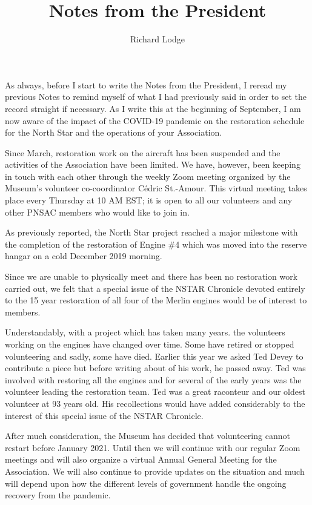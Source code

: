 
%


\title{Notes from the President}
\author{Richard Lodge}

\maketitle

As always, before I start to write the Notes from the President, I reread my
previous Notes to remind myself of what I had previously said in order to set
the record straight if necessary. As I write this at the beginning of
September, I am now aware of the impact of the COVID-19 pandemic on the
restoration schedule for the North Star and the operations of your
Association.

Since March, restoration work on the aircraft has been suspended and the
activities of the Association have been limited. We have, however, been keeping
in touch with each other through the weekly Zoom meeting organized by the
Museum's volunteer co-coordinator Cédric St.-Amour. This virtual meeting takes
place every Thursday at 10 AM EST; it is open to all our volunteers and any
other PNSAC members who would like to join in.

As previously reported, the North Star project reached a major milestone with
the completion of the restoration of Engine \#4 which was moved into the
reserve hangar on a cold December 2019 morning.

Since we are unable to physically meet and there has been no restoration work
carried out, we felt that a special issue of the NSTAR Chronicle devoted
entirely to the 15 year restoration of all four of the Merlin engines would be
of interest to members.

Understandably, with a project which has taken many years. the volunteers
working on the engines have changed over time. Some have retired or stopped
volunteering and sadly, some have died. Earlier this year we asked Ted Devey to
contribute a piece but before writing about of his work, he passed away. Ted
was involved with restoring all the engines and for several of the early years
was the volunteer leading the restoration team. Ted was a great raconteur and
our oldest volunteer at 93 years old. His recollections would have added
considerably to the interest of this special issue of the NSTAR
Chronicle.

After much consideration, the Museum has decided that volunteering cannot
restart before January 2021. Until then we will continue with our regular Zoom
meetings and will also organize a virtual Annual General Meeting for the
Association. We will also continue to provide updates on the situation and much
will depend upon how the different levels of government handle the ongoing
recovery from the pandemic.

